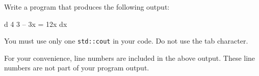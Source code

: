 Write a program that produces the following output:
\begin{console}[numbers=left]
 d   4      3
-- 3x  = 12x
dx

\end{console}
You must use only one \verb!std::cout! in your code. 
Do not use the tab character. 

For your convenience, line numbers are included in the above output.
These line numbers are not part of your program output.

